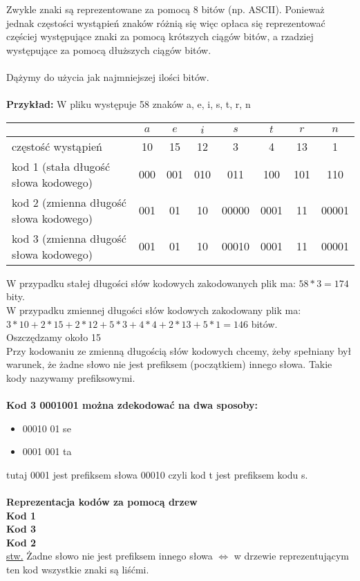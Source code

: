Zwykle znaki są reprezentowane za pomocą 8 bitów (np. ASCII). Ponieważ jednak częstości wystąpień znaków różnią się więc opłaca się reprezentować częściej występujące znaki za pomocą krótszych ciągów bitów, a rzadziej  występujące za pomocą dłuższych ciągów bitów.\\
\\
Dążymy do użycia jak najmniejszej ilości bitów.\\
\\
\textbf{Przykład:} W pliku występuje 58 znaków a, e, i, s, t, r, n\\
\begin{center}
\begin{tabular}{ l | c | c | c | c | c | c | c }
  	 										& $a$	& $e$ 	& $i$ 	& $s$ 	& $t$ 	& $r$ 	& $n$ 	\\ \hline
  częstość wystąpień 						& 10	&  15  	& 12	&  3  	&  4	&  13	&  1 	\\ \hline
  kod 1 (stała długość słowa kodowego) 		& 000 	& 001 	& 010	& 011 	& 100	& 101	& 110 	\\ \hline
  kod 2 (zmienna długość słowa kodowego) 	& 001 	& 01 	& 10	& 00000 & 0001	& 11	& 00001 \\ \hline
  kod 3 (zmienna długość słowa kodowego) 	& 001 	& 01 	& 10	& 00010 & 0001	& 11	& 00001 \\  
\end{tabular}
\end{center}

W przypadku stałej długości słów kodowych zakodowanych plik ma: $58*3=174$ bity.\\
W przypadku zmiennej długości słów kodowych zakodowany plik ma: $3*10+2*15+2*12+5*3+4*4+2*13+5*1 = 146$ bitów.\\
Oszczędzamy około 15%
\\
Przy kodowaniu ze zmienną długością słów kodowych chcemy, żeby spełniany był warunek, że żadne słowo nie jest prefiksem (początkiem) innego słowa. Takie kody nazywamy prefiksowymi.\\
\\
\textbf{Kod 3 0001001 można zdekodować na dwa sposoby:}
\begin{itemize}
	\item 00010 01 se
	\item 0001 001 ta 
\end{itemize}
tutaj 0001 jest prefiksem słowa 00010 czyli kod t jest prefiksem kodu s.\\
\\
\textbf{Reprezentacja kodów za pomocą drzew}\\
\textbf{Kod 1}\\
\textbf{Kod 3}\\
\textbf{Kod 2}\\
\underline{stw.} Żadne słowo nie jest prefiksem innego słowa $\Leftrightarrow$ w drzewie reprezentującym ten kod wszystkie znaki są liśćmi.

